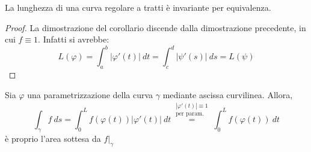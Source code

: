 \begin{corollary}
    La lunghezza di una curva regolare a tratti è invariante per equivalenza.
    \end{corollary}
    \begin{proof}
        La dimostrazione del corollario discende dalla dimostrazione precedente, in cui $f \equiv 1$.
        Infatti si avrebbe:
        \begin{equation*}
            L(\varphi)=\int_{a}^{b}{|\varphi'(t)|\ dt}=\int_{c}^{d}{|\psi'(s)|\ ds}=L(\psi)
        \end{equation*}
    \end{proof}
    \begin{oss}
        Sia $\varphi$ una parametrizzazione della curva $\gamma$ mediante ascissa curvilinea. Allora,
        \begin{equation*}
            \int_{\gamma}{f \ ds}= \int_{0}^{L}{f(\varphi(t))|\varphi'(t)|\ dt} \overset{\substack{|\varphi'(t)| \equiv 1\\ \text{per param.}}}{=} \int_{0}^{L}{f(\varphi(t))\ dt}
        \end{equation*}
        è proprio l'area sottesa da $f\Big|_{\gamma}$
    \end{oss}